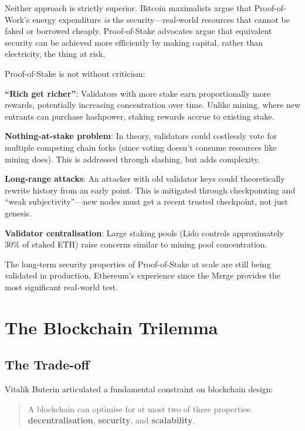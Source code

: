 \documentclass[11pt,a4paper]{article}
\newcommand{\keyword}[1]{\textbf{\textcolor{AccentOrange}{#1}}}
\begin{document}
Neither approach is strictly superior. Bitcoin maximalists argue that Proof-of-Work's energy expenditure \textit{is} the security---real-world resources that cannot be faked or borrowed cheaply. Proof-of-Stake advocates argue that equivalent security can be achieved more efficiently by making capital, rather than electricity, the thing at risk.


Proof-of-Stake is not without criticism:

\textbf{``Rich get richer''}: Validators with more stake earn proportionally more rewards, potentially increasing concentration over time. Unlike mining, where new entrants can purchase hashpower, staking rewards accrue to existing stake.

\textbf{Nothing-at-stake problem}: In theory, validators could costlessly vote for multiple competing chain forks (since voting doesn't consume resources like mining does). This is addressed through slashing, but adds complexity.

\textbf{Long-range attacks}: An attacker with old validator keys could theoretically rewrite history from an early point. This is mitigated through checkpointing and ``weak subjectivity''---new nodes must get a recent trusted checkpoint, not just genesis.

\textbf{Validator centralisation}: Large staking pools (Lido controls approximately 30\% of staked ETH) raise concerns similar to mining pool concentration.

The long-term security properties of Proof-of-Stake at scale are still being validated in production. Ethereum's experience since the Merge provides the most significant real-world test.

\section{The Blockchain Trilemma}

\subsection{The Trade-off}

Vitalik Buterin articulated a fundamental constraint on blockchain design:

\begin{quote}
A blockchain can optimise for at most two of three properties: \keyword{decentralisation}, \keyword{security}, and \keyword{scalability}.
\end{quote}
\end{document}
